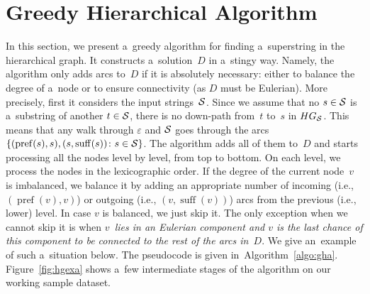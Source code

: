 \documentclass[11pt]{article}
\DeclareMathOperator{\pref}{pref}
\DeclareMathOperator{\suff}{suff}
\begin{document}
\section{Greedy Hierarchical Algorithm}
In this section, we present a~greedy algorithm for
finding a~superstring in the hierarchical graph. 
It constructs a~solution~$D$ in a~stingy way. 
Namely, the algorithm only adds arcs to~$D$ 
if it is absolutely necessary: either to balance the degree of a~node or to ensure connectivity 
(as $D$ must be Eulerian). 
More precisely, first it considers the input
strings~${\cal S}$. Since we assume that 
no $s \in {\cal S}$ is a~substring of another 
$t \in {\cal S}$, there is no down-path from~$t$ to~$s$ in $HG_{\cal S}$. 
This means that any walk through $\varepsilon$ and ${\cal S}$ goes through the arcs $\{(\operatorname{pref}(s), s), (s, \operatorname{suff}(s)) \colon s \in {\cal S}\}$. The algorithm adds all of them to~$D$ and starts processing all the nodes level by level, from top to bottom. On each level, we process the nodes in the lexicographic order. If the degree of the current node~$v$ is imbalanced, we balance it by adding an appropriate number of incoming (i.e., $(\pref(v),v)$) or outgoing (i.e., $(v, \suff(v))$) arcs from the previous (i.e., lower) level. In case $v$ is balanced, we just skip it. The only exception when we cannot skip it is when {\em $v$~lies in an Eulerian component and $v$ is the last chance of this component to be connected to the rest of the arcs in~$D$}. We give an~example of such a~situation below. The pseudocode is given in~Algorithm~\ref{algo:gha}. Figure~\ref{fig:hgexa} shows a~few intermediate stages of the algorithm on our working sample dataset.
\end{document}
